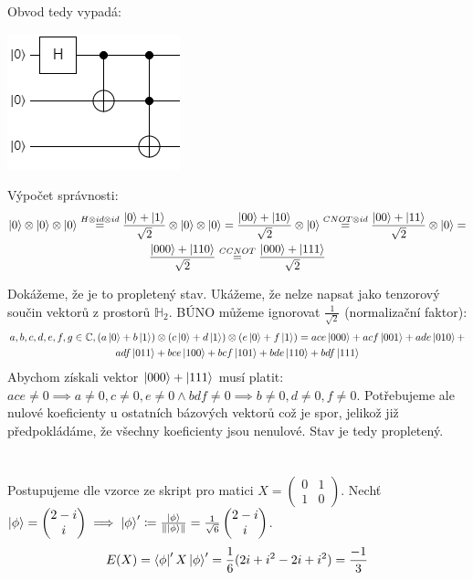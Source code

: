 \documentclass[12pt, a4paper]{article}
\begin{document}
Obvod tedy vypadá:
\begin{center}
\includegraphics{7/circ.png}
\end{center}
Výpočet správnosti:
\begin{gather*}
\ket{0} \otimes \ket{0} \otimes \ket{0} \stackrel{H \otimes id \otimes id}{=} \frac{\ket{0}+\ket{1}}{\sqrt{2}} \otimes \ket{0} \otimes \ket{0} = \frac{\ket{00}+\ket{10}}{\sqrt{2}} \otimes \ket{0} \stackrel{CNOT \otimes id}{=} \frac{\ket{00}+\ket{11}}{\sqrt{2}} \otimes \ket{0} = \\
\frac{\ket{000}+\ket{110}}{\sqrt{2}} \stackrel{CCNOT}{=} \frac{\ket{000}+\ket{111}}{\sqrt{2}}
\end{gather*}

Dokážeme, že je to propletený stav. Ukážeme, že nelze napsat jako tenzorový součin vektorů z prostorů $\mathbb{H}_2$. BÚNO můžeme ignorovat $\frac{1}{\sqrt{2}}$ (normalizační faktor):
\begin{gather*}
a,b,c,d,e,f,g \in \mathbb{C}, (a\ket{0}+b\ket{1})\otimes(c\ket{0}+d\ket{1})\otimes(e\ket{0}+f\ket{1}) = ace\ket{000} + acf\ket{001} + ade\ket{010} + \\
adf\ket{011} + bce\ket{100} + bcf\ket{101} + bde\ket{110} + bdf\ket{111}
\end{gather*}
Abychom získali vektor $\ket{000}+\ket{111}$ musí platit: $ace \neq 0 \implies a\neq0, c\neq 0, e\neq 0 \land bdf \neq 0 \implies b\neq 0, d \neq 0, f \neq 0$. Potřebujeme ale nulové koeficienty u ostatních bázových vektorů což je spor, jelikož již předpokládáme, že všechny koeficienty jsou nenulové. Stav je tedy propletený.

\section{}
Postupujeme dle vzorce ze skript pro matici $X = \begin{pmatrix}
0 & 1 \\
1 & 0
\end{pmatrix}$. Nechť $\ket{\phi} = \begin{pmatrix} 2-i \\ i \end{pmatrix} \implies \ket{\phi}' \coloneqq \frac{\ket{\phi}}{\lVert \ket{\phi} \rVert} = \frac{1}{\sqrt{6}} \begin{pmatrix}
2-i \\ i 
\end{pmatrix}$.
\begin{gather*}
E(X) = \bra{\phi}' X \ket{\phi}' = \frac{1}{6} (2i + i^2 -2i + i^2) = \frac{-1}{3}
\end{gather*}
\end{document}
